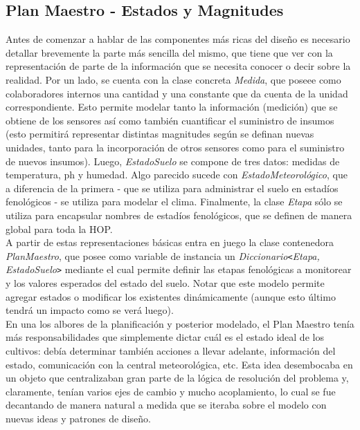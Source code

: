\subsection{Plan Maestro - Estados y Magnitudes}

Antes de comenzar a hablar de las componentes más ricas del diseño es necesario detallar brevemente la parte más sencilla del mismo, que tiene que ver con la representación de parte de la información que se necesita conocer o decir sobre la realidad. Por un lado, se cuenta con la clase concreta \textsl{Medida}, que poseee como colaboradores internos una cantidad y una constante que da cuenta de la unidad correspondiente. Esto permite modelar tanto la información (medición) que se obtiene de los sensores así como también cuantificar el suministro de insumos (esto permitirá representar distintas magnitudes según se definan nuevas unidades, tanto para la incorporación de otros sensores como para el suministro de nuevos insumos). Luego, \textsl{EstadoSuelo} se compone de tres datos: medidas de temperatura, ph y humedad. Algo parecido sucede con \textsl{EstadoMeteorológico}, que a diferencia de la primera - que se utiliza para administrar el suelo en estadíos fenológicos - se utiliza para modelar el clima. Finalmente, la clase \textsl{Etapa} sólo se utiliza para encapsular nombres de estadíos fenológicos, que se definen de manera global para toda la HOP.\\
\indent A partir de estas representaciones básicas entra en juego la clase contenedora \textsl{PlanMaestro}, que posee como variable de instancia un \textsl{Diccionario}\verb|<|\textsl{Etapa, EstadoSuelo}\verb|>| mediante el cual permite definir las etapas fenológicas a monitorear y los valores esperados del estado del suelo. Notar que este modelo permite agregar estados o modificar los existentes dinámicamente (aunque esto último tendrá un impacto como se verá luego).\\
\indent En una los albores de la planificación y posterior modelado, el Plan Maestro tenía más responsabilidades que simplemente dictar cuál es el estado ideal de los cultivos: debía determinar también acciones a llevar adelante, información del estado, comunicación con la central meteorológica, etc. Esta idea desembocaba en un objeto que centralizaban gran parte de la lógica de resolución del problema y, claramente, tenían varios ejes de cambio y mucho acoplamiento, lo cual se fue decantando de manera natural a medida que se iteraba sobre el modelo con nuevas ideas y patrones de diseño.

